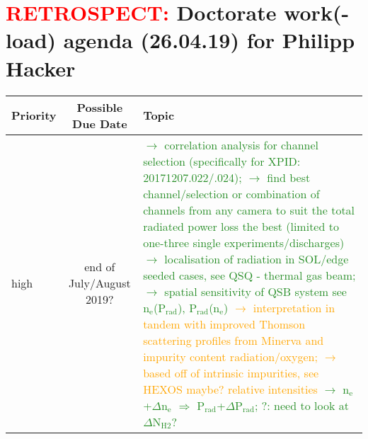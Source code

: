 \documentclass[%
    a4,
    10pt,
    twoside
    ]{%
    scrreprt%
    }
\newcommand{\ix}[1]{_\text{#1}}
\begin{document}
    \thispagestyle{empty}

    \section*{%
        \textcolor{red}{RETROSPECT:}\newline%
        Doctorate work(-load) agenda (26.04.19) for Philipp Hacker%
    }%

        \begin{table}[h!]%

            \begin{tabular}{l|c|p{}}%

                \large{\textbf{Priority}} & %
                \large{\textbf{Possible Due Date}} & %
                \large{\textbf{Topic}} \\%
                \hline\hline%

                high & %
                end of July/August 2019? & %
                \textcolor{ForestGreen}{%
                  $\rightarrow$ correlation analysis for channel selection (specifically for XPID: 20171207.022/.024);%
                }\newline%
                \textcolor{ForestGreen}{%
                  $\rightarrow$ find best channel/selection or combination of channels from any camera to suit the total radiated power loss the best (limited to one-three single experiments/discharges)%
                }\newline%
                \textcolor{ForestGreen}{%
                  $\rightarrow$ localisation of radiation in SOL/edge seeded cases, see QSQ - thermal gas beam;%
                }\newline%
                \textcolor{ForestGreen}{%
                  $\rightarrow$ spatial sensitivity of QSB system see n$\ix{e}$(P$\ix{rad}$), P$\ix{rad}$(n$\ix{e}$)%
                }\newline%
                \textcolor{orange}{%
                  $\rightarrow$ interpretation in tandem with improved Thomson scattering profiles from Minerva and impurity content radiation/oxygen;%
                }\newline%
                \textcolor{orange}{%
                  $\rightarrow$ based off of intrinsic impurities, see HEXOS maybe? relative intensities%
                }\newline%
                \textcolor{ForestGreen}{%
                  $\rightarrow$ n$\ix{e}$+$\Delta$n$\ix{e}$ $\Rightarrow$ P$\ix{rad}$+$\Delta$P$\ix{rad}$;%
                }\newline%
                \textcolor{ForestGreen}{%
                  ?: need to look at $\Delta$N$\ix{H2}$?%
                }%
                \\\hline%


\end{tabular}
\end{table}
\end{document}
